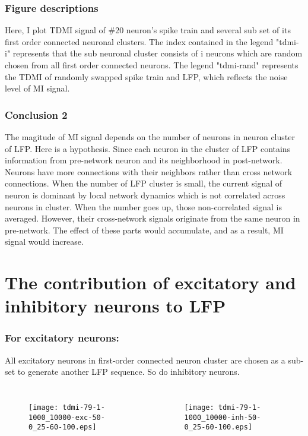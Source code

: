 \documentclass{beamer}
\begin{document}
	\begin{frame}
	\frametitle{Figure descriptions}
	Here, I plot TDMI signal of \#20 neuron's spike train and several sub set of its first order connected neuronal clusters. The index contained in the legend "tdmi-i" represents that the sub neuronal cluster consists of i neurons which are random chosen from all first order connected neurons. The legend "tdmi-rand" represents the TDMI of randomly swapped spike train and LFP, which reflects the noise level of MI signal.\par
	\end{frame}
	
	\begin{frame}
	\frametitle{Conclusion 2}
	The magitude of MI signal depends on the number of neurons in neuron cluster of LFP. Here is a hypothesis. Since each neuron in the cluster of LFP contains information from pre-network neuron and its neighborhood in post-network. Neurons have more connections with their neighbors rather than cross network connections. When the number of LFP cluster is small, the current signal of neuron is dominant by local network dynamics which is not correlated across neurons in cluster. When the number goes up, those non-correlated signal is averaged. However, their cross-network signals originate from the same neuron in pre-network. The effect of these parts would accumulate, and as a result, MI signal would increase.
	
	\end{frame}
	\section{The contribution of excitatory and inhibitory neurons to LFP}
	\begin{frame}
	\frametitle{For excitatory neurons:}
	All excitatory neurons in first-order connected neuron cluster are chosen as a sub-set to generate another LFP sequence. So do inhibitory neurons.
	\begin{columns}[b]
	\begin{figure}
	\centering
	\texttt{[image: tdmi-79-1-1000\_10000-exc-50-0\_25-60-100.eps]}	
	\label{fig:8}
	\end{figure}
	\begin{figure}
	\texttt{[image: tdmi-79-1-1000\_10000-inh-50-0\_25-60-100.eps]}	
	\label{fig:9}
	\end{figure}
	\end{columns}	
	\end{frame}
	
\end{document}
